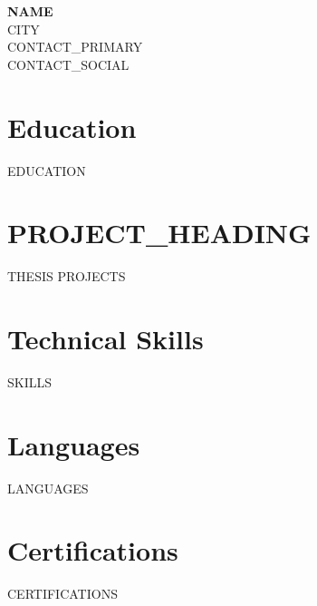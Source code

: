 \documentclass[a4paper,11pt]{article}
\begin{document}
\begin{center}
{\LARGE\textbf{{{NAME}}}}\\[3pt]
{{CITY}}\\[2pt]
{{CONTACT_PRIMARY}}\\[2pt]
{{CONTACT_SOCIAL}}
\end{center}

\section*{Education}
{{EDUCATION}}
\section*{{{PROJECT_HEADING}}}
{{THESIS}}
{{PROJECTS}}
\section*{Technical Skills}
{{SKILLS}}

\vspace{5pt}

\noindent
\begin{minipage}[t]{0.47\textwidth}
    \section*{Languages}
    {{LANGUAGES}}
\end{minipage}
\hfill
\begin{minipage}[t]{0.47\textwidth}
    \section*{Certifications}
    \begin{itemize}[leftmargin=5mm, itemsep=0pt, topsep=0pt, parsep=0pt]
        {{CERTIFICATIONS}}
    \end{itemize}
\end{minipage}
\end{document}
